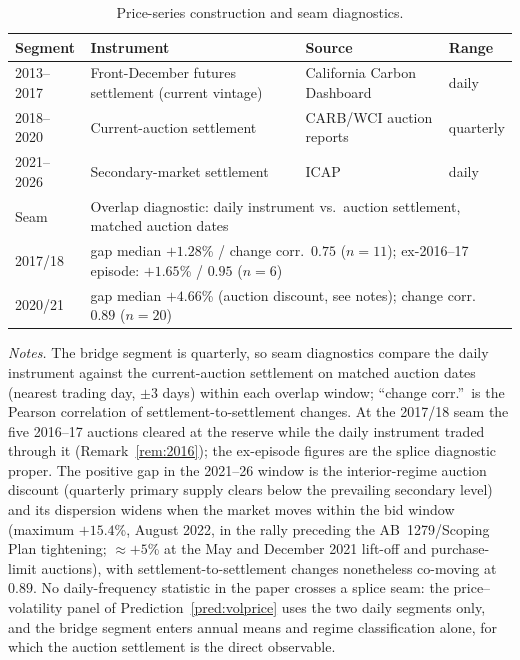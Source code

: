 \documentclass[11pt,letterpaper]{article}
\theoremstyle{plain}
\theoremstyle{definition}
\numberwithin{equation}{section}
\begin{document}
\begin{table}[H]\centering
\caption{Price-series construction and seam diagnostics.}
\label{tab:splice}
\footnotesize
\begin{tabular}{@{}l l l l@{}}
\toprule
Segment & Instrument & Source & Range\\
\midrule
2013--2017 & Front-December futures settlement (current vintage) & California Carbon Dashboard & daily\\
2018--2020 & Current-auction settlement & CARB/WCI auction reports & quarterly\\
2021--2026 & Secondary-market settlement & ICAP & daily\\
\midrule
Seam & \multicolumn{3}{l}{Overlap diagnostic: daily instrument vs.\ auction settlement, matched auction dates}\\
\midrule
2017/18 & \multicolumn{3}{l}{gap median $+1.28$\% / change corr.\ $0.75$ ($n=11$); ex-2016--17 episode: $+1.65$\% / $0.95$ ($n=6$)}\\
2020/21 & \multicolumn{3}{l}{gap median $+4.66$\% (auction discount, see notes); change corr.\ $0.89$ ($n=20$)}\\
\bottomrule
\end{tabular}

\smallskip
{\footnotesize\justifying
\textit{Notes.}
The bridge segment is quarterly, so seam diagnostics compare the daily instrument against the current-auction settlement on matched auction dates (nearest trading day, $\pm3$ days) within each overlap window; ``change corr.''\ is the Pearson correlation of settlement-to-settlement changes. At the 2017/18 seam the five 2016--17 auctions cleared at the reserve while the daily instrument traded through it (Remark~\ref{rem:2016}); the ex-episode figures are the splice diagnostic proper. The positive gap in the 2021--26 window is the interior-regime auction discount (quarterly primary supply clears below the prevailing secondary level) and its dispersion widens when the market moves within the bid window (maximum $+15.4$\%, August 2022, in the rally preceding the AB~1279/Scoping Plan tightening; $\approx+5$\% at the May and December 2021 lift-off and purchase-limit auctions), with settlement-to-settlement changes nonetheless co-moving at $0.89$. No daily-frequency statistic in the paper crosses a splice seam: the price--volatility panel of Prediction~\ref{pred:volprice} uses the two daily segments only, and the bridge segment enters annual means and regime classification alone, for which the auction settlement is the direct observable.\par}
\end{table}
\end{document}
